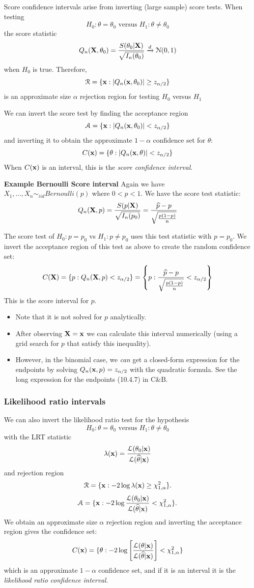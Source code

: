 \documentclass[11pt,]{article}
\newcommand{\Xndots}{X_1, \ldots, X_n}
\def\bx{{\bf x}}
\def\bX{{\bf X}}
\def\phat{{\widehat p}}
\def\thetahat{{\widehat\theta}}
\def\Asc{{\cal A}}
\def\Lsc{{\cal L}}
\def\Nsc{{\cal N}}
\def\Rsc{{\cal R}}
\begin{document}
Score confidence intervals arise from inverting (large sample) score
tests. When testing
\[H_0: \theta = \theta_0 \mbox{ versus } H_1: \theta \neq \theta_0\] the
score statistic
\[Q_n(\bX,\theta_0) = \frac{S(\theta_0|\bX)}{\sqrt{I_n(\theta_0)}}\xrightarrow{d} \Nsc(0,1)\]
when \(H_0\) is true. Therefore,
\[\Rsc = \{\bx: |Q_n(\bx,\theta_0)|\geq z_{\alpha/2}\}\] is an
approximate size \(\alpha\) rejection region for testing \(H_0\) versus
\(H_1\)

We can invert the score test by finding the acceptance region
\[\Asc = \{\bx: |Q_n(\bx,\theta_0)|< z_{\alpha/2}\}\] and inverting it
to obtain the approximate \(1-\alpha\) confidence set for \(\theta\):
\[C(\bx) = \{\theta: |Q_n(\bx,\theta)|< z_{\alpha/2}\}\] When \(C(\bx)\)
is an interval, this is the \emph{score confidence interval}.

\noindent\textbf{Example Bernoulli Score interval} Again we have
\(\Xndots \sim_{iid} Bernoulli(p)\) where \(0 < p < 1\). We have the
score test statistic:
\[Q_n(\bX, p) = \frac{S(p|\bX)}{\sqrt{I_n(p_0)}} = \frac{\phat - p}{\sqrt{\frac{p(1-p)}{n}}}
\]

The score test of \(H_0: p = p_0\) vs \(H_1: p \neq p_0\) uses this test
statistic with \(p=p_0\). We invert the acceptance region of this test
as above to create the random confidence set:
\[C(\bX) = \{p : Q_n(\bX,p) < z_{\alpha/2}\} = \left\{p: \frac{\phat - p}{\sqrt{\frac{p(1-p)}{n}}} < z_{\alpha/2} \right\}\]
This is the score interval for \(p\).

\begin{itemize}
\item Note that it is not solved for $p$ analytically.
\item After observing $\bX = \bx$ we can calculate this interval numerically (using a grid search for $p$ that satisfy this inequality).
\item However, in the binomial case, we {\em can} get a closed-form expression for the endpoints by solving $Q_n(\bx, p) = z_{\alpha/2}$ with the quadratic formula. See the long expression for the endpoints (10.4.7) in C\&B.
\end{itemize}

\subsubsection{Likelihood ratio intervals}

We can also invert the likelihood ratio test for the hypothesis
\[H_0: \theta = \theta_0 \mbox{ versus } H_1: \theta \neq \theta_0\]
with the LRT statistic
\[\lambda(\bx) = \frac{\Lsc(\theta_0|\bx)}{\Lsc(\thetahat|\bx)}\] and
rejection region
\[\Rsc = \{ \bx: -2 \log \lambda(\bx) \geq \chi^2_{1,\alpha}\}.\]
\[\Asc = \{ \bx: -2 \log \frac{\Lsc(\theta_0|\bx)}{\Lsc(\thetahat|\bx)}< \chi^2_{1,\alpha}\}.\]
We obtain an approximate size \(\alpha\) rejection region and inverting
the acceptance region gives the confidence set:
\[C(\bx) = \{\theta: -2 \log \left[ \frac{\Lsc(\theta|\bx)}{\Lsc(\thetahat|\bx)} \right] < \chi^2_{1,\alpha}\}\]
which is an approximate \(1-\alpha\) confidence set, and if it is an
interval it is the \emph{likelihood ratio confidence interval}.
\end{document}
